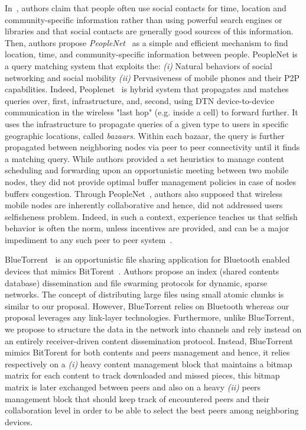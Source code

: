 In~\cite{Peoplenet}, authors claim that people often use social contacts for time, location and community-specific information rather than using powerful search engines or libraries and that social contacts are generally good sources of this information. Then, authors propose  \emph{PeopleNet}~\cite{Peoplenet} as a simple and efficient mechanism to find location, time, and community-specific information between people. PeopleNet is a query matching system that exploits the: \emph{(i)} Natural behaviors of social networking and social mobility \emph{(ii)} Pervasiveness of mobile phones and their P2P capabilities. Indeed, Peoplenet~\cite{Peoplenet} is hybrid system that propagates and matches queries over, first, infrastructure, and, second, using DTN device-to-device communication in the wireless "last hop" (e.g. inside a cell) to forward further. It uses the  infrastructure to propagate queries of a given type to users in specific geographic locations, called \emph{bazaars}. Within each bazaar, the query is further propagated between neighboring nodes via peer to peer connectivity until it finds a matching query. While authors provided a set heuristics to manage content scheduling and forwarding upon an opportunistic meeting between two mobile nodes, they did not provide optimal buffer management policies in case of nodes buffers congestion. Through PeopleNet~\cite{Peoplenet}, authors also supposed that wireless mobile nodes are inherently collaborative and hence, did not addressed users selfisheness problem. Indeed, in such a context, experience teaches us that selfish behavior is often the norm, unless incentives are provided, and can be a major impediment to any such peer to peer system~\cite{NashEquilibria}.
  
BlueTorrent~\cite{BlueTorrent} is an opportunistic file sharing application for Bluetooth enabled devices that mimics BitTorent~\cite{RefBT}. Authors propose an index (shared contents database) dissemination and file swarming protocols for dynamic, sparse networks. The concept of distributing large files using small atomic chunks is similar to our proposal. However, BlueTorrent relies on Bluetooth whereas our proposal leverages any link-layer technologies. Furthermore, unlike BlueTorrent, we propose to structure the data in the network into channels and rely instead on an entirely receiver-driven content dissemination protocol. Instead, BlueTorrent mimics BitTorent for both contents and peers management and hence, it relies respectively on a \emph{(i)} heavy content management block that maintains a bitmap matrix for each content to track downloaded and missed pieces, this bitmap matrix is later exchanged between peers and also on a heavy \emph{(ii)} peers management block that should keep track of encountered peers and their collaboration level in order to be able to select the best peers among neighboring devices.

